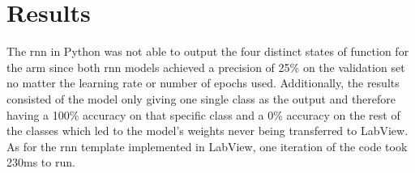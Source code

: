 \section{Results}
\label{section:results}


The \acrshort{rnn} in Python was not able to output the four distinct states of 
function for the arm since both \acrshort{rnn} models achieved a precision of 25\% on the validation set no matter the
learning rate or number of epochs used. Additionally, the results consisted of the model only giving one single class as the output
and therefore having a 100\% accuracy on that specific class and a 0\% accuracy on the rest of the classes which 
led to the model's weights never being transferred to LabView.
As for the \acrshort{rnn} template implemented in LabView, one iteration of the code took 230ms to run.